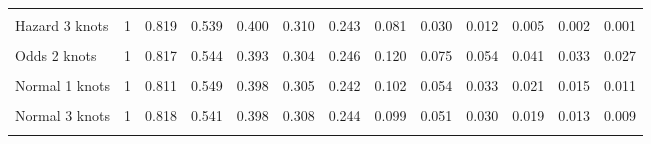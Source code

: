\documentclass[
]{article}
\begin{document}
\begin{table}[H]
{\begin{tabular}[t]{lrrrrrrrrrrrr}
\cellcolor{gray!10}{Hazard 2 knots} & \cellcolor{gray!10}{1} & \cellcolor{gray!10}{0.817} & \cellcolor{gray!10}{0.545} & \cellcolor{gray!10}{0.396} & \cellcolor{gray!10}{0.305} & \cellcolor{gray!10}{0.243} & \cellcolor{gray!10}{0.096} & \cellcolor{gray!10}{0.043} & \cellcolor{gray!10}{0.021} & \cellcolor{gray!10}{0.010} & \cellcolor{gray!10}{0.005} & \cellcolor{gray!10}{0.003}\\
Hazard 3 knots & 1 & 0.819 & 0.539 & 0.400 & 0.310 & 0.243 & 0.081 & 0.030 & 0.012 & 0.005 & 0.002 & 0.001\\
\cellcolor{gray!10}{Odds 1 knots} & \cellcolor{gray!10}{1} & \cellcolor{gray!10}{0.820} & \cellcolor{gray!10}{0.542} & \cellcolor{gray!10}{0.390} & \cellcolor{gray!10}{0.303} & \cellcolor{gray!10}{0.248} & \cellcolor{gray!10}{0.127} & \cellcolor{gray!10}{0.082} & \cellcolor{gray!10}{0.060} & \cellcolor{gray!10}{0.047} & \cellcolor{gray!10}{0.038} & \cellcolor{gray!10}{0.032}\\
Odds 2 knots & 1 & 0.817 & 0.544 & 0.393 & 0.304 & 0.246 & 0.120 & 0.075 & 0.054 & 0.041 & 0.033 & 0.027\\
\cellcolor{gray!10}{Odds 3 knots} & \cellcolor{gray!10}{1} & \cellcolor{gray!10}{0.818} & \cellcolor{gray!10}{0.542} & \cellcolor{gray!10}{0.398} & \cellcolor{gray!10}{0.308} & \cellcolor{gray!10}{0.246} & \cellcolor{gray!10}{0.110} & \cellcolor{gray!10}{0.066} & \cellcolor{gray!10}{0.045} & \cellcolor{gray!10}{0.033} & \cellcolor{gray!10}{0.026} & \cellcolor{gray!10}{0.021}\\
Normal 1 knots & 1 & 0.811 & 0.549 & 0.398 & 0.305 & 0.242 & 0.102 & 0.054 & 0.033 & 0.021 & 0.015 & 0.011\\
\cellcolor{gray!10}{Normal 2 knots} & \cellcolor{gray!10}{1} & \cellcolor{gray!10}{0.815} & \cellcolor{gray!10}{0.546} & \cellcolor{gray!10}{0.392} & \cellcolor{gray!10}{0.303} & \cellcolor{gray!10}{0.245} & \cellcolor{gray!10}{0.113} & \cellcolor{gray!10}{0.065} & \cellcolor{gray!10}{0.042} & \cellcolor{gray!10}{0.029} & \cellcolor{gray!10}{0.021} & \cellcolor{gray!10}{0.016}\\
Normal 3 knots & 1 & 0.818 & 0.541 & 0.398 & 0.308 & 0.244 & 0.099 & 0.051 & 0.030 & 0.019 & 0.013 & 0.009\\
\cellcolor{gray!10}{Mixture cure Weibull} & \cellcolor{gray!10}{1} & \cellcolor{gray!10}{0.819} & \cellcolor{gray!10}{0.585} & \cellcolor{gray!10}{0.403} & \cellcolor{gray!10}{0.290} & \cellcolor{gray!10}{0.229} & \cellcolor{gray!10}{0.179} & \cellcolor{gray!10}{0.179} & \cellcolor{gray!10}{0.179} & \cellcolor{gray!10}{0.179} & \cellcolor{gray!10}{0.179} & \cellcolor{gray!10}{0.179}\\

\end{tabular}}
\end{table}
\end{document}
